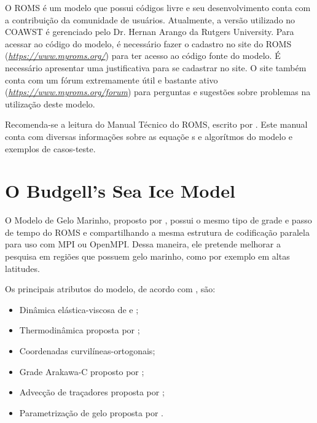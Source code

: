 \noindent O ROMS é um modelo que possui códigos livre e seu desenvolvimento conta com a contribuição da comunidade de usuários. Atualmente, a versão utilizado no COAWST é gerenciado pelo Dr. Hernan Arango da Rutgers University. Para acessar ao código do modelo, é necessário fazer o cadastro no site do ROMS (\textcolor{bleu_cite}{\href{https://www.myroms.org/}{\textit{https://www.myroms.org/}}}) para ter acesso ao código fonte do modelo. É necessário apresentar uma justificativa para se cadastrar no site. O site também conta com um fórum extremamente útil e bastante ativo (\textcolor{bleu_cite}{\href{https://www.myroms.org/forum}{\textit{https://www.myroms.org/forum}}}) para perguntas e sugestões sobre problemas na utilização deste modelo.
\bigskip

\noindent Recomenda-se a leitura do Manual Técnico do ROMS, escrito por \textcite{hedstrom2018}. Este manual conta com diversas informações sobre as equaçõe s e algorítmos do modelo e exemplos de casos-teste. 



\section{O Budgell's Sea Ice Model}
\bigskip

\noindent O Modelo de Gelo Marinho, proposto por \textcite{Budgell2005}, possui o mesmo tipo de grade e passo de tempo do ROMS e compartilhando a mesma estrutura de codificação paralela para uso com MPI ou OpenMPI. Dessa maneira, ele pretende melhorar a pesquisa em regiões que possuem gelo marinho, como por exemplo em altas latitudes. 
\bigskip

\noindent Os principais atributos do modelo, de acordo com \textcite{hedstrom2018}, são:
\bigskip
\begin{itemize}
    \item Dinâmica elástica-viscosa de \textcite{Hunke1997} e \textcite{Hunke2001};
    \item Thermodinâmica proposta por \textcite{Mellor1989};
    \item Coordenadas curvilíneas-ortogonais;
    \item Grade Arakawa-C proposto  por \textcite{Arakawa1977};
    \item Advecção de traçadores proposta por \textcite{Smolarkiewicz1990};
    \item Parametrização de gelo proposta por \textcite{Lemieux2015}.
\end{itemize}
\bigskip


